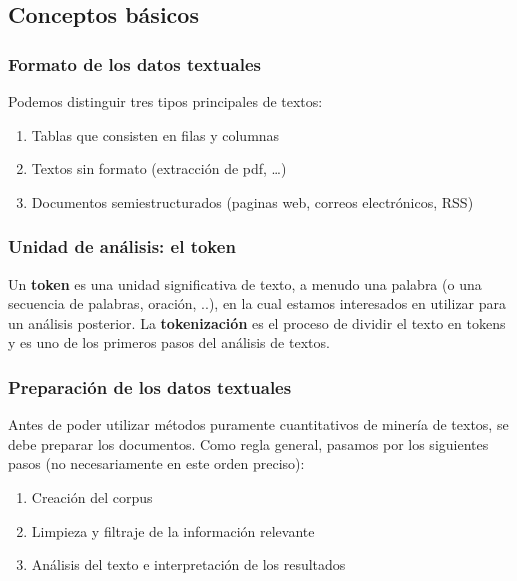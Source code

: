 \documentclass[]{article}
\providecommand{\tightlist}{%
  \setlength{\itemsep}{0pt}\setlength{\parskip}{0pt}}
\begin{document}
\subsection{Conceptos básicos}\label{conceptos-basicos}

\subsubsection{Formato de los datos
textuales}\label{formato-de-los-datos-textuales}

Podemos distinguir tres tipos principales de textos:

\begin{enumerate}
\def\labelenumi{\arabic{enumi}.}
\tightlist
\item
  Tablas que consisten en filas y columnas
\item
  Textos sin formato (extracción de pdf, \ldots{})
\item
  Documentos semiestructurados (paginas web, correos electrónicos, RSS)
\end{enumerate}

\subsubsection{Unidad de análisis: el
token}\label{unidad-de-analisis-el-token}

Un \textbf{token} es una unidad significativa de texto, a menudo una
palabra (o una secuencia de palabras, oración, ..), en la cual estamos
interesados en utilizar para un análisis posterior. La
\textbf{tokenización} es el proceso de dividir el texto en tokens y es
uno de los primeros pasos del análisis de textos.

\subsubsection{Preparación de los datos
textuales}\label{preparacion-de-los-datos-textuales}

Antes de poder utilizar métodos puramente cuantitativos de minería de
textos, se debe preparar los documentos. Como regla general, pasamos por
los siguientes pasos (no necesariamente en este orden preciso):

\begin{enumerate}
\def\labelenumi{\arabic{enumi}.}
\tightlist
\item
  Creación del corpus
\item
  Limpieza y filtraje de la información relevante
\item
  Análisis del texto e interpretación de los resultados
\end{enumerate}
\end{document}
